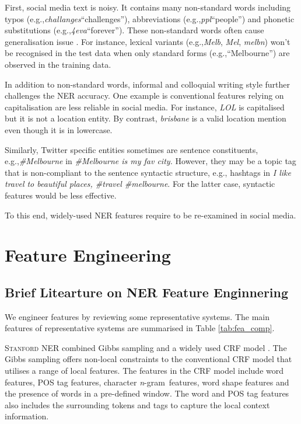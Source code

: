 \documentclass[11pt]{article}
\newcommand{\eg}{e.g.,\xspace}
\newcommand{\mygl}[1]{``#1''}
\newcommand{\myex}[1]{\textit{#1}}
\newcommand{\lexpair}[2]{\myex{#1}\xspace\mygl{#2}}
\newcommand{\ngram}{\textit{n}-gram\ }
\newcommand{\stanford}{\textsc{Stanford}\xspace}
\newcommand{\tabref}[2][]{Table#1 \ref{#2}}
\begin{document}
First, social media text is noisy.
It contains many non-standard words including typos (\eg \lexpair{challanges}{challenges}), abbreviations (\eg \lexpair{ppl}{people}) and phonetic substitutions (\eg \lexpair{4eva}{forever}).
These non-standard words often cause generalisation issue \cite{acl11han}.
For instance, lexical variants (\eg \myex{Melb}, \myex{Mel}, \myex{melbn}) won't be recognised in the test data when only standard forms (\eg \mygl{Melbourne}) are observed in the training data.

In addition to non-standard words, informal and colloquial writing style further challenges the NER accuracy.
One example is conventional features relying on capitalisation are less reliable in social media.
For instance, \myex{LOL} is capitalised but it is not a location entity.
By contrast, \myex{brisbane} is a valid location mention even though it is in lowercase.

Similarly, Twitter specific entities sometimes are sentence constituents, \eg \myex{\#Melbourne} in \myex{\#Melbourne is my fav city.}
However, they may be a topic tag that is non-compliant to the sentence syntactic structure, \eg hashtags in \myex{I like travel to beautiful places, \#travel \#melbourne}.
For the latter case, syntactic features would be less effective.

To this end, widely-used NER features require to be re-examined in social media.

\section{Feature Engineering}
\label{sec:feature}

\subsection{Brief Litearture on NER Feature Enginnering}
\label{sec:literature}
We engineer features by reviewing some representative systems.
The main features of representative systems are summarised in \tabref{tab:fea_comp}.

\stanford NER combined Gibbs sampling and a widely used CRF model \cite{acl05fink}.
The Gibbs sampling offers non-local constraints to the conventional CRF model that utilises a range of local features.
The features in the CRF model include word features, POS tag features, character \ngram features, word shape features and the presence of words in a pre-defined window.
The word and POS tag features also includes the surrounding tokens and tags to capture the local context information.
\end{document}
